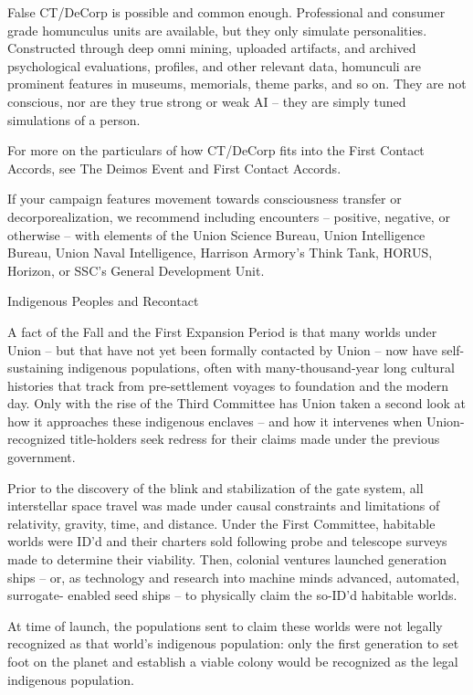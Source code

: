 False CT/DeCorp is possible and common enough. Professional and consumer grade
homunculus units are available, but they only simulate personalities. Constructed through deep
omni mining, uploaded artifacts, and archived psychological evaluations, profiles, and other
relevant data, homunculi are prominent features in museums, memorials, theme parks, and so
on. They are not conscious, nor are they true strong or weak AI -- they are simply tuned
simulations of a person.


For more on the particulars of how CT/DeCorp fits into the First Contact Accords, see The
Deimos Event and First Contact Accords.


If your campaign features movement towards consciousness transfer or decorporealization, we
recommend including encounters -- positive, negative, or otherwise -- with elements of the
Union Science Bureau, Union Intelligence Bureau, Union Naval Intelligence, Harrison Armory’s
Think Tank, HORUS, Horizon, or SSC’s General Development Unit.





Indigenous Peoples and Recontact

A fact of the Fall and the First Expansion Period is that many worlds under Union -- but that have
not yet been formally contacted by Union -- now have self-sustaining indigenous populations,
often with many-thousand-year long cultural histories that track from pre-settlement voyages to
foundation and the modern day. Only with the rise of the Third Committee has Union taken a
second look at how it approaches these indigenous enclaves -- and how it intervenes when
Union-recognized title-holders seek redress for their claims made under the previous
government.


Prior to the discovery of the blink and stabilization of the gate system, all interstellar space travel
was made under causal constraints and limitations of relativity, gravity, time, and distance. Under
the First Committee, habitable worlds were ID’d and their charters sold following probe and
telescope surveys made to determine their viability. Then, colonial ventures launched generation
ships -- or, as technology and research into machine minds advanced,  automated, surrogate-
enabled seed ships -- to physically claim the so-ID’d habitable worlds.


At time of launch, the populations sent to claim these worlds were not legally recognized as that
world’s indigenous population: only the first generation to set foot on the planet and establish a
viable colony would be recognized as the legal indigenous population.


